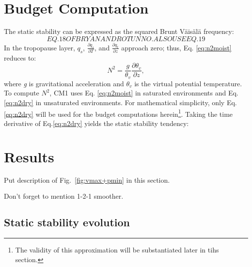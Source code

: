 \documentclass{ametsoc}
\begin{document}
 \section{Budget Computation}

The static stability can be expressed as the squared Brunt V{\"a}is{\"a}l{\"a} frequency:
   \begin{equation} \label{eq:n2moist}
   EQ. 18 OF BRYAN AND ROTUNNO. ALSO USE EQ. 19
   \end{equation}
In the tropopause layer, $q_s$, $\frac{\partial q_s}{\partial T}$, and $\frac{\partial q_t}{\partial z}$ approach zero; thus, Eq. \ref{eq:n2moist} reduces to:
   \begin{equation} \label{eq:n2dry}
   N^2 = \frac{g}{\theta_v}\frac{\partial \theta_v}{\partial z},
   \end{equation}
where \textit{g} is gravitational acceleration and $\theta_v$ is the virtual potential temperature.
To compute $N^2$, CM1 uses Eq. \ref{eq:n2moist} in saturated environments and Eq. \ref{eq:n2dry} in unsaturated environments.
For mathematical simplicity, only Eq. \ref{eq:n2dry} will be used for the budget computations herein\footnote{The validity of this approximation will be substantiated later in tihs section.}.
Taking the time derivative of Eq.\ref{eq:n2dry} yields the static stability tendency:

 \section{Results}

Put description of Fig.~\ref{fig:vmax+pmin} in this section. 

Don't forget to mention 1-2-1 smoother.

 \subsection{Static stability evolution}
\end{document}
